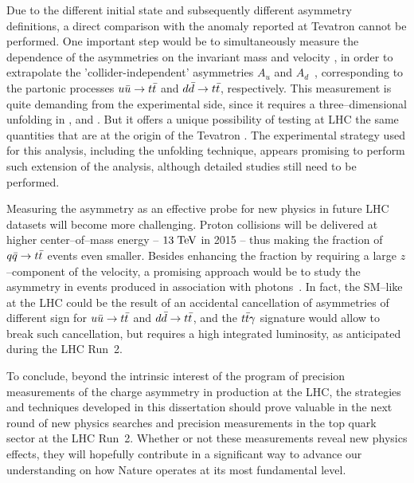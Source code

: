 Due to the different initial state and subsequently different
asymmetry definitions, a direct comparison with the anomaly reported
at Tevatron cannot be performed. One important step would be to
simultaneously measure the dependence of the asymmetries on the
\ttbar{} invariant mass \mtt{} and velocity \betatt{}, in order to
extrapolate the 'collider-independent' asymmetries $A_u$ and
$A_d$~\cite{AguilarSaavedra:2012va}, corresponding to the partonic
processes $u\bar{u}\to t\bar{t}{}$ and $d\bar{d}\to t\bar{t}{}$, respectively. 
This measurement is quite demanding from the experimental side, since it requires a
three--dimensional unfolding in \mtt{}, \betatt{} and \dy{}. But it offers
a unique possibility of testing at LHC the same quantities that are at
the origin of the Tevatron \afb{}.
The experimental strategy used for this analysis, including the
unfolding technique, appears promising to perform such extension of
the analysis, although detailed studies still need to be performed.

Measuring the asymmetry \ac{} as an effective probe for new physics in
future LHC datasets will become more challenging. Proton collisions
will be delivered at higher center--of--mass energy -- $13\; \mathrm{TeV}{}$ in
2015 -- thus making the fraction of $q\bar{q}{}\to t\bar{t}{}$ events even
smaller. Besides enhancing the \qqbar{} fraction by requiring a large
$z$--component of the \ttbar{} velocity, a promising approach would be to
study the asymmetry in \ttbar{} events produced in association with
photons~\cite{Aguilar-Saavedra:2014vta}.
In fact, the SM--like \ac{} at the LHC could be the result of an accidental
cancellation of asymmetries of different sign for $u\bar{u}\to t\bar{t}$
and $d\bar{d}\to t\bar{t}$, and the $t\bar{t}{}\gamma$ signature would allow
to break such cancellation, but requires a high integrated luminosity,
as anticipated during the LHC \mbox{Run 2}.

To conclude, beyond the intrinsic interest of the program of precision
measurements of the charge asymmetry in \ttbar{} production at the LHC,
the strategies and techniques developed in this dissertation should prove
valuable in the next round of new physics searches and precision
measurements in the top quark sector at the LHC \mbox{Run 2}.
Whether or not these measurements reveal new physics effects, they
will hopefully contribute in a significant way to advance our understanding on
how Nature operates at its most fundamental level.